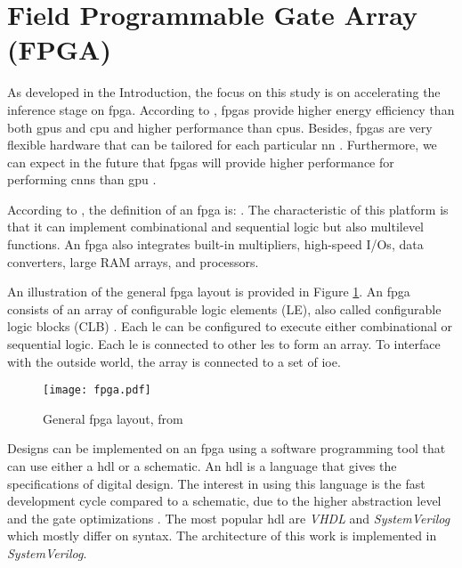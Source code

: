 \section{Field Programmable Gate Array (FPGA)} \label{sec:fpga}
%
%
As developed in the Introduction, the focus on this study is on accelerating the inference stage on \acrshort{fpga}. According to \textcite{mittal_survey_2015}, \acrshort{fpga}s provide higher energy efficiency than both \acrshort{gpu}s and \acrshort{cpu} and higher performance than \acrshort{cpu}s. Besides, \acrshort{fpga}s are very flexible hardware that can be tailored for each particular \acrshort{nn} \cite{vestias_fast_2019}. Furthermore, we can expect in the future that \acrshort{fpga}s will provide higher performance for performing \acrshort{cnn}s than \acrshort{gpu} \cite{nurvitadhi_can_2017}.

According to \textcite{harris_digital_2015}, the definition of an \acrshort{fpga} is: . The characteristic of this platform is that it can implement combinational and sequential logic but also multilevel functions. An \acrshort{fpga} also integrates built-in multipliers, high-speed I/Os, data converters, large RAM arrays, and processors.

An illustration of the general \acrshort{fpga} layout is provided in Figure \ref{fig:fpga}. An \acrshort{fpga} consists of an array of configurable logic elements (LE), also called configurable logic blocks (CLB) \cite{harris_digital_2015}. Each \acrshort{le} can be configured to execute either combinational or sequential logic. Each \acrshort{le} is connected to other \acrshort{le}s to form an array. To interface with the outside world, the array is connected to a set of \acrfull{ioe}.
%
\begin{figure}[H]
    \centering
    \texttt{[image: fpga.pdf]}
    \caption{General \acrshort{fpga} layout, from \cite{harris_digital_2015}}
    \label{fig:fpga}
\end{figure}

Designs can be implemented on an \acrshort{fpga} using a software programming tool that can use either a \acrfull{hdl} or a schematic. An \acrshort{hdl} is a language that gives the specifications of digital design. The interest in using this language is the fast development cycle compared to a schematic, due to the higher abstraction level and the gate optimizations \cite{harris_digital_2015}. The most popular \acrshort{hdl} are \textit{VHDL} and \textit{SystemVerilog} which mostly differ on syntax. The architecture of this work is implemented in \textit{SystemVerilog}. 

